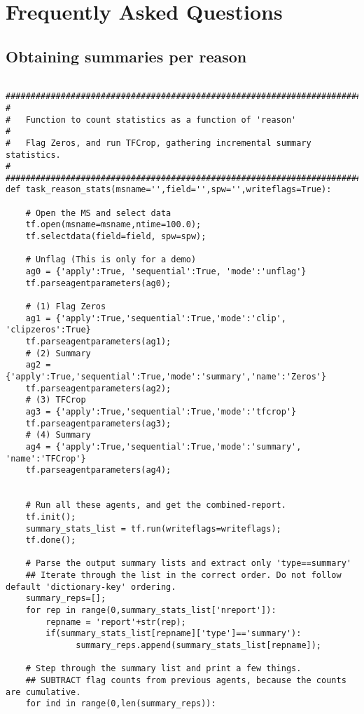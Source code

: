 \section{Frequently Asked Questions}\label{Sec:FAQ}

\subsection{Obtaining summaries per reason}
\begin{verbatim}

#########################################################################
#
#   Function to count statistics as a function of 'reason'
#   
#   Flag Zeros, and run TFCrop, gathering incremental summary statistics.
#
#########################################################################
def task_reason_stats(msname='',field='',spw='',writeflags=True):

    # Open the MS and select data
    tf.open(msname=msname,ntime=100.0);
    tf.selectdata(field=field, spw=spw);

    # Unflag (This is only for a demo)
    ag0 = {'apply':True, 'sequential':True, 'mode':'unflag'}
    tf.parseagentparameters(ag0);

    # (1) Flag Zeros
    ag1 = {'apply':True,'sequential':True,'mode':'clip', 'clipzeros':True}
    tf.parseagentparameters(ag1);
    # (2) Summary
    ag2 = {'apply':True,'sequential':True,'mode':'summary','name':'Zeros'}
    tf.parseagentparameters(ag2);
    # (3) TFCrop
    ag3 = {'apply':True,'sequential':True,'mode':'tfcrop'}
    tf.parseagentparameters(ag3);
    # (4) Summary
    ag4 = {'apply':True,'sequential':True,'mode':'summary', 'name':'TFCrop'}
    tf.parseagentparameters(ag4);


    # Run all these agents, and get the combined-report.
    tf.init();
    summary_stats_list = tf.run(writeflags=writeflags);
    tf.done();

    # Parse the output summary lists and extract only 'type==summary'
    ## Iterate through the list in the correct order. Do not follow default 'dictionary-key' ordering.
    summary_reps=[];
    for rep in range(0,summary_stats_list['nreport']):
        repname = 'report'+str(rep);
        if(summary_stats_list[repname]['type']=='summary'):
              summary_reps.append(summary_stats_list[repname]);

    # Step through the summary list and print a few things.
    ## SUBTRACT flag counts from previous agents, because the counts are cumulative.
    for ind in range(0,len(summary_reps)):


\end{verbatim}

